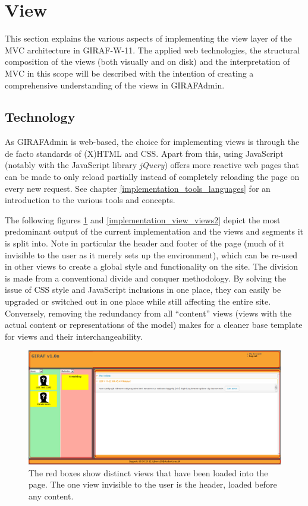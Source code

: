 \section{View}
\label{view}
This section explains the various aspects of implementing the view layer of the MVC architecture in GIRAF-W-11. The applied web technologies, the structural composition of the views (both visually and on disk) and the interpretation of MVC in this scope will be described with the intention of creating a comprehensive understanding of the views in GIRAFAdmin.

\subsection{Technology}
As GIRAFAdmin is web-based, the choice for implementing views is through the de facto standards of (X)HTML and CSS. Apart from this, using JavaScript (notably with the JavaScript library \emph{jQuery}) offers more reactive web pages that can be made to only reload partially instead of completely reloading the page on every new request. See chapter \vref{implementation_tools_languages} for an introduction to the various tools and concepts.

The following figures \ref{implementation_view_views1} and \ref{implementation_view_views2} depict the most predominant output of the current implementation and the views and segments it is split into. Note in particular the header and footer of the page (much of it invisible to the user as it merely sets up the environment), which can be re-used in other views to create a global style and functionality on the site. The division is made from a conventional divide and conquer methodology. By solving the issue of CSS style and JavaScript inclusions in one place, they can easily be upgraded or switched out in one place while still affecting the entire site. Conversely, removing the redundancy from all ``content'' views (views with the actual content or representations of the model) makes for a cleaner base template for views and their interchangeability.

\begin{figure}
    \begin{center}
    \includegraphics[scale=0.45,angle=90]{img/mvc_details/mvc_detailed_views}
    \caption{\label{implementation_view_views1}The red boxes show distinct views that have been loaded into the page. The one view invisible to the user is the header, loaded before any content.}
    \end{center}
\end{figure}

